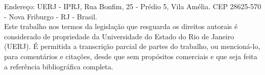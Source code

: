 {	Endereço: UERJ - IPRJ,  Rua Bonfim, 25 - Prédio 5, Vila Amélia. CEP 28625-570 - Nova Friburgo - RJ - Brasil.\\

	\noindent
	Este trabalho nos termos da legislação que resguarda os direitos autorais é considerado de propriedade da Universidade do Estado do Rio de Janeiro (UERJ). É permitida a transcrição parcial de partes do trabalho, ou mencioná-lo, para comentários e citações, desde que sem propósitos comerciais e que seja feita a referência bibliográfica completa.
	
	\begin{flushright}
		\assinatura{\imprimirautor}
	\end{flushright}
}

\imprimircatalogacao